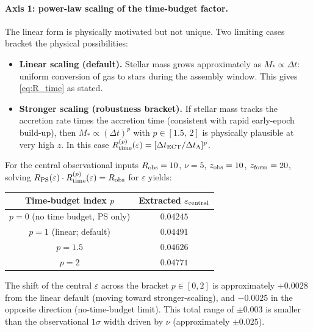 \paragraph{Axis 1: power-law scaling of the time-budget factor.}
The linear form is physically motivated but not unique. Two
limiting cases bracket the physical possibilities:
\begin{itemize}
\item \textbf{Linear scaling (default).} Stellar mass grows
  approximately as $M_* \propto \Delta t$: uniform conversion
  of gas to stars during the assembly window. This gives
  \eqref{eq:R_time} as stated.
\item \textbf{Stronger scaling (robustness bracket).} If stellar
  mass tracks the accretion rate times the accretion time
  (consistent with rapid early-epoch build-up), then
  $M_* \propto (\Delta t)^p$ with $p \in [1.5,\,2]$ is physically
  plausible at very high $z$. In this case
  $R_{\rm time}^{(p)}(\varepsilon) =
  [\Delta t_{\rm ECT}/\Delta t_\Lambda]^p$.
\end{itemize}
For the central observational inputs $R_{\rm obs} = 10$,
$\nu = 5$, $z_{\rm obs} = 10$, $z_{\rm form} = 20$, solving
$R_{\rm PS}(\varepsilon) \cdot R_{\rm time}^{(p)}(\varepsilon) =
R_{\rm obs}$ for $\varepsilon$ yields:
\begin{center}
\begin{tabular}{|c|c|}
\hline
Time-budget index $p$ & Extracted $\varepsilon_{\rm central}$ \\
\hline
$p = 0$ (no time budget, PS only)     & $0.04245$ \\
$p = 1$ (linear; default)             & $0.04491$ \\
$p = 1.5$                             & $0.04626$ \\
$p = 2$                               & $0.04771$ \\
\hline
\end{tabular}
\end{center}
The shift of the central $\varepsilon$ across the bracket
$p \in [0, 2]$ is approximately $+0.0028$ from the linear default
(moving toward stronger-scaling), and $-0.0025$ in the opposite
direction (no-time-budget limit). This total range of $\pm 0.003$
is smaller than the observational $1\sigma$ width driven by $\nu$
(approximately $\pm 0.025$).

